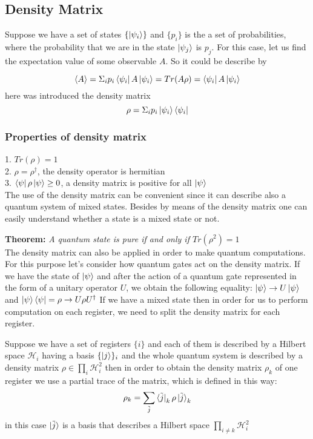 \documentclass[english,14pt,a4paper]{article}
\begin{document}
	\subsection{Density Matrix}
	Suppose we have a set of states $\{\ket{\psi_i}\}$ and $\{p_i\}$ is the a set of probabilities, where the probability that we are in the state $\ket{\psi_j}$ is $p_j$. For this case, let us find the expectation value of some observable $A$. So it could be describe by 
	
	\[
	\left\langle A \right\rangle = \Sigma_i p_i \bra{\psi _i} A \ket{\psi_i} = Tr(A \rho) = \bra{\psi_i} A \ket{\psi_i}
	\]
	here was introduced the density matrix 
	\[
	\rho = \Sigma_i p_i \ket{\psi_i} \bra{\psi_i}
	\]
	\subsubsection{Properties of density matrix} 
	1. $Tr(\rho) = 1$ \\
	2. $\rho = \rho^{\dag}$, the density operator is hermitian \\
	3. $\bra{\psi}\rho\ket{\psi} \geq 0  $, a density matrix is positive for all $\ket{\psi}$ \\
	The use of the density matrix can be convenient since it can describe also a quantum system of mixed states. Besides by means of the density matrix one can easily understand whether a state is a mixed state or not. 
	
	\textbf{Theorem:} \textit{A quantum state is pure if and only if $Tr(\rho^2) = 1$} \\
	
	The density matrix can also be applied in order to make quantum computations. For this purpose let's consider how quantum gates act on the density matrix. If we have the state of $\ket{\psi}$ and after the action of a quantum gate represented in the form of a unitary operator $U$, we obtain the following equality: $\ket{\psi} \rightarrow U\ket{\psi}$ and $\ket{\psi}\bra{\psi} = \rho \rightarrow U\rho U^{\dag}$
	If we have a mixed state then in order for us to perform computation on each register, we need to split the density matrix for each register. 	
	
	Suppose we have a set of registers $\{i\}$ and each of them is described by a Hilbert space $\mathcal{H}_i$ having a basis $\{\ket{j}\}_i$ and the whole quantum system is described by a density matrix $\rho  \in \prod_i \mathcal{H}_i^2$ then in order to obtain the density matrix $\rho_k$ of one register we use a partial trace of the matrix, which is defined in this way:	\[
	\rho_k = \sum_{\tilde{j}} \bra{\tilde{j}}_k \rho \ket{\tilde{j}}_k
	\]  
	in this case $\ket{\tilde{j}}$ is a basis that describes a Hilbert space $\prod_{i \neq k} \mathcal{H}_i^2 $ 
	
\end{document}
